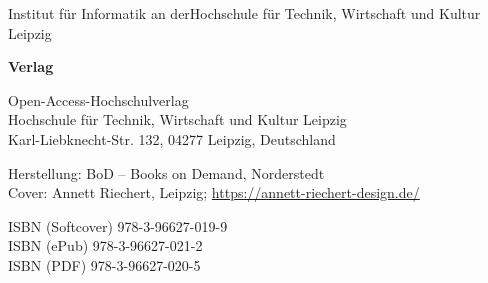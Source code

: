 \begin{flushleft}
Institut für Informatik an der\linebreak Hochschule für Technik, Wirtschaft und Kultur Leipzig

\vspace{1em}

\textbf{Verlag}

Open-Access-Hochschulverlag\\
Hochschule für Technik, Wirtschaft und Kultur Leipzig\\
Karl-Liebknecht-Str. 132, 04277 Leipzig, Deutschland

\vspace{1em}

Herstellung: BoD – Books on Demand, Norderstedt\\
Cover: Annett Riechert, Leipzig; \url{https://annett-riechert-design.de/}

\vspace{1em}

ISBN (Softcover) 978-3-96627-019-9\\
ISBN (ePub) 978-3-96627-021-2\\
ISBN (PDF) 978-3-96627-020-5
\end{flushleft}
\clearpage

\vfill
\clearpage
